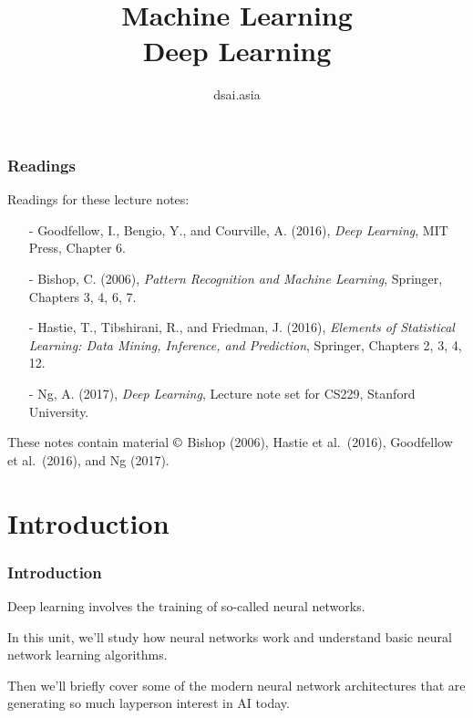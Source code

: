 \documentclass{beamer}
\title[Machine Learning]{Machine Learning\\Deep Learning}
\author{dsai.asia}
\institute[]{Asian Data Science and Artificial Intelligence Master's Program}
\date{}
\begin{document}


\frame{\titlepage}

%

\begin{frame}
\frametitle{Readings}

Readings for these lecture notes:
\begin{itemize}
\item[-] Goodfellow, I., Bengio, Y., and Courville, A. (2016),
  \textit{Deep Learning}, MIT Press, Chapter 6.
\item[-] Bishop, C. (2006), \textit{Pattern Recognition and Machine Learning},
  Springer, Chapters 3, 4, 6, 7.
\item[-] Hastie, T., Tibshirani, R., and Friedman, J. (2016),
  \textit{Elements of Statistical Learning: Data Mining, Inference, and
    Prediction}, Springer, Chapters 2, 3, 4, 12.
\item[-] Ng, A. (2017), \textit{Deep Learning},
  Lecture note set for CS229, Stanford University.
\end{itemize}

These notes contain material $\copyright$ Bishop (2006), Hastie et
al.\ (2016), Goodfellow et al.\ (2016), and Ng (2017).

\end{frame}

\section{Introduction}

\begin{frame}[fragile]
\frametitle{Introduction}

  Deep learning involves the training of so-called \alert{neural
    networks}.

  \medskip

  In this unit, we'll study how neural networks work and understand
  basic neural network learning algorithms.

  \medskip

  Then we'll briefly cover some of the modern neural network
  architectures that are generating so much layperson interest in AI
  today.

\end{frame}
\end{document}
